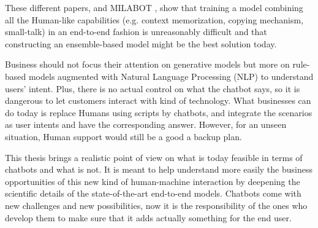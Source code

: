These different papers, and MILABOT \citep{alexa-1709.02349}, show that training a model combining all the Human-like capabilities (e.g. context memorization, copying mechanism, small-talk) in an end-to-end fashion is unreasonably difficult and that constructing an ensemble-based model might be the best solution today.





Business should not focus their attention on generative models but more on rule-based models augmented with Natural Language Processing (NLP) to understand users' intent. Plus, there is no actual control on what the chatbot says, so it is dangerous to let customers interact with kind of technology.
What businesses can do today is replace Humans using scripts by chatbots, and integrate the scenarios as user intents and have the corresponding answer. However, for an unseen situation, Human support would still be a good a backup plan.

This thesis brings a realistic point of view on what is today feasible in terms of chatbots and what is not. It is meant to help understand more easily the business opportunities of this new kind of human-machine interaction by deepening the scientific details of the state-of-the-art end-to-end models.
Chatbots come with new challenges and new possibilities, now it is the responsibility of the ones who develop them to make sure that it adds actually something for the end user.
